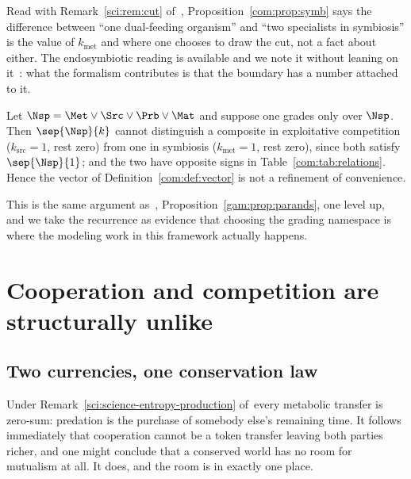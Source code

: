 \begin{remark}\label{com:organism-boundary-grade}
Read with Remark~\ref{sci:rem:cut} of~\chSci, Proposition~\ref{com:prop:symb} says the difference between
``one dual-feeding organism'' and ``two specialists in symbiosis'' is the value of
$k_{\mathrm{met}}$ and where one chooses to draw the cut, not a fact about either. The
endosymbiotic reading is available and we note it without leaning on it~\cite{Margulis}: what the
formalism contributes is that the boundary has a number attached to it.
\end{remark}

\begin{proposition}\label{com:grading-namespace-must-be}
Let $\Nsp = \Met \vee \Src \vee \Prb \vee \Mat$ and suppose one grades only over $\Nsp$. Then
$\sep{\Nsp}{k}$ cannot distinguish a composite in exploitative competition ($k_{\mathrm{src}}=1$,
rest zero) from one in symbiosis ($k_{\mathrm{met}}=1$, rest zero), since both satisfy
$\sep{\Nsp}{1}$; and the two have opposite signs in Table~\ref{com:tab:relations}. Hence the vector
of Definition~\ref{com:def:vector} is not a refinement of convenience.
\end{proposition}

This is the same argument as~\chGame, Proposition~\ref{gam:prop:parands}, one level up, and we take the recurrence as
evidence that choosing the grading namespace is where the modeling work in this framework
actually happens.

\section{Cooperation and competition are structurally unlike}\label{com:sec:coop}\label{com:S6}

\subsection{Two currencies, one conservation law}\label{com:S6.1}

Under Remark~\ref{sci:science-entropy-production} of~\chSci every metabolic transfer is zero-sum: predation is the
purchase of somebody else's remaining time. It follows immediately that cooperation cannot be a
token transfer leaving both parties richer, and one might conclude that a conserved world has no
room for mutualism at all. It does, and the room is in exactly one place.

